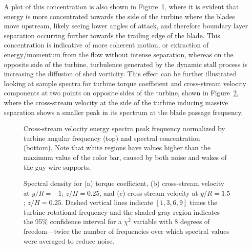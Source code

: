 A plot of this concentration is also shown in Figure~\ref{fig:fcont}, where it
is evident that energy is more concentrated towards the side of the  turbine
where the blades move upstream, likely seeing lower angles of attack, and
therefore boundary layer separation occurring further towards the trailing edge
of the blade. This concentration is indicative of more coherent motion, or
extraction of energy/momentum from the flow without intense separation, whereas
on the opposite side of the turbine, turbulence generated by the dynamic stall
process is increasing the diffusion of shed vorticity. This effect can be
further illustrated looking at sample spectra for turbine torque coefficient and
cross-stream velocity components at two points on opposite sides of the turbine,
shown in Figure~\ref{fig:multispec}, where the cross-stream velocity at the side
of the turbine inducing massive separation shows a smaller peak in its spectrum
at the blade passage frequency.

\begin{figure}[h]
    \centering
    

    \caption{Cross-stream velocity energy spectra peak frequency normalized by
        turbine angular frequency (top) and spectral concentration (bottom). Note
        that white regions have values higher than the maximum value of the color
        bar, caused by both noise and wakes of the guy wire supports.}
    
    \label{fig:fcont}
\end{figure}

\begin{figure}
    \centering


    \caption{Spectral density for (a) torque coefficient, (b) cross-stream
        velocity at $y/R = -1$; $z/H = 0.25$, and (c) cross-stream velocity at $y/R
        = 1.5$; $z/H = 0.25$. Dashed vertical lines indicate $[1, 3, 6, 9]$ times
        the turbine rotational frequency and the shaded gray region indicates the
        95\% confidence interval for a $\chi^2$ variable with 8 degrees of
        freedom---twice the number of frequencies over which spectral values were
        averaged to reduce noise.}
    
    \label{fig:multispec}
\end{figure}



